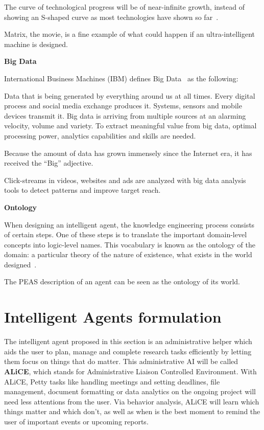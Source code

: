 \documentclass[titlepage, letterpaper, fleqn]{article}
\newcommand{\spacepls}{\vspace{5mm}}
\newcommand{\defys}[1]{
	\spacepls %
	\textbf{#1}
}
\begin{document}
The curve of technological progress will be of near-infinite growth, instead of showing an S-shaped curve as most technologies have shown so far~\cite{TechSing}.

Matrix, the movie, is a fine example of what could happen if an ultra-intelligent machine is designed.

\defys{Big Data}

International Business Machines (IBM) defines Big Data~\cite{Big} as the following:

\begin{displayquote}
  Data that is being generated by everything around us at all times.
  Every digital process and social media exchange produces it.
  Systems, sensors and mobile devices transmit it.
  Big data is arriving from multiple sources at an alarming velocity, volume and variety.
  To extract meaningful value from big data, optimal processing power, analytics capabilities and skills are needed.
\end{displayquote}

Because the amount of data has grown immensely since the Internet era, it has received the ``Big'' adjective.

Click-streams in videos, websites and ads are analyzed with big data analysis tools to detect patterns and improve target reach.

\defys{Ontology}

When designing an intelligent agent, the knowledge engineering process consists of certain steps.
One of these steps is to translate the important domain-level concepts into logic-level names.
This vocabulary is known as the ontology of the domain:
a particular theory of the nature of existence, what exists in the world designed~\cite{Onto}.

The PEAS description of an agent can be seen as the ontology of its world.

\section{Intelligent Agents formulation}
\label{sec:agent}

The intelligent agent proposed in this section is an administrative helper which aids the user to plan, manage and complete research tasks efficiently by letting them focus on things that do matter.
This administrative AI will be called \textbf{ALiCE}, which stands for Administrative Liaison Controlled Environment.
With ALiCE, Petty tasks like handling meetings and setting deadlines, file management, document formatting or data analytics on the ongoing project will need less attentions from the user.
Via behavior analysis, ALiCE will learn which things matter and which don't, as well as when is the best moment to remind the user of important events or upcoming reports.
\end{document}
